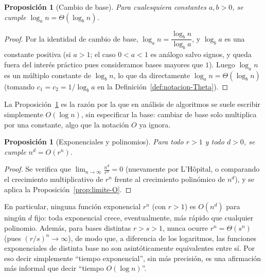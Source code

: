 \documentclass[12pt, spanish, oneside, openany]{book}
\theoremstyle{uprightplain}
\newtheorem{proposicion}[teorema]{Proposición}
\theoremstyle{definition}
\theoremstyle{remark}
\theoremstyle{definition}
\begin{document}
\begin{proposicion}[Cambio de base]
\label{prop:cambio-base}
Para cualesquiera constantes $a,b>0$, se cumple $\log_a n = \Theta(\log_b n)$.
\end{proposicion}
\begin{proof}
Por la identidad de cambio de base, $\log_a n = \dfrac{\log_b n}{\log_b a}$, y $\log_b a$ es una constante positiva (si $a>1$; el caso $0<a<1$ es análogo salvo signos, y queda fuera del interés práctico pues consideramos bases mayores que $1$). Luego $\log_a n$ es un múltiplo constante de $\log_b n$, lo que da directamente $\log_a n=\Theta(\log_b n)$ (tomando $c_1=c_2=1/\log_b a$ en la Definición~\ref{def:notacion-Theta}).
\end{proof}

La Proposición~\ref{prop:cambio-base} es la razón por la que en análisis de algoritmos se suele escribir simplemente $O(\log n)$, sin especificar la base: cambiar de base solo multiplica por una constante, algo que la notación $O$ ya ignora.

\begin{proposicion}[Exponenciales y polinomios]
\label{prop:exp-poli}
Para todo $r>1$ y todo $d>0$, se cumple $n^d = O(r^n)$.
\end{proposicion}
\begin{proof}
Se verifica que $\displaystyle\lim_{n\to\infty}\frac{n^d}{r^n}=0$ (nuevamente por L'Hôpital, o comparando el crecimiento multiplicativo de $r^n$ frente al crecimiento polinómico de $n^d$), y se aplica la Proposición~\ref{prop:limite-O}.
\end{proof}

En particular, ninguna función exponencial $r^n$ (con $r>1$) es $O(n^d)$ para ningún $d$ fijo: toda exponencial crece, eventualmente, más rápido que cualquier polinomio. Además, para bases distintas $r>s>1$, nunca ocurre $r^n=\Theta(s^n)$ (pues $(r/s)^n\to\infty$), de modo que, a diferencia de los logaritmos, las funciones exponenciales de distinta base no son asintóticamente equivalentes entre sí. Por eso decir simplemente ``tiempo exponencial'', sin más precisión, es una afirmación más informal que decir ``tiempo $O(\log n)$''.
\end{document}
